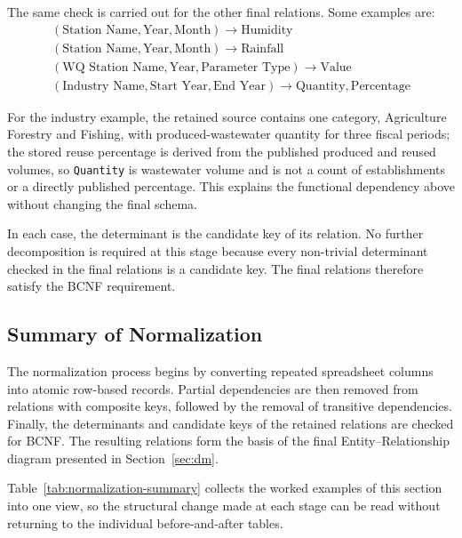 The same check is carried out for the other final relations. Some examples are:
\begin{gather*}
(\text{Station Name},\text{Year},\text{Month})\rightarrow \text{Humidity}\\
(\text{Station Name},\text{Year},\text{Month})\rightarrow \text{Rainfall}\\
(\text{WQ Station Name},\text{Year},\text{Parameter Type})
\rightarrow \text{Value}\\
(\text{Industry Name},\text{Start Year},\text{End Year})
\rightarrow \text{Quantity},\text{Percentage}
\end{gather*}

For the industry example, the retained source contains one category,
Agriculture Forestry and Fishing, with produced-wastewater quantity for three
fiscal periods; the stored reuse percentage is derived from the published
produced and reused volumes, so \texttt{Quantity} is wastewater volume and is
not a count of establishments or a directly published percentage. This
explains the functional dependency above without changing the final schema.

In each case, the determinant is the candidate key of its relation. No further
decomposition is required at this stage because every non-trivial determinant
checked in the final relations is a candidate key. The final relations
therefore satisfy the BCNF requirement.

\subsection{Summary of Normalization}
\label{subsec:normalization-summary}

The normalization process begins by converting repeated spreadsheet columns
into atomic row-based records. Partial dependencies are then removed from
relations with composite keys, followed by the removal of transitive
dependencies. Finally, the determinants and candidate keys of the retained
relations are checked for BCNF. The resulting relations form the basis of the
final Entity--Relationship diagram presented in Section~\ref{sec:dm}.

Table~\ref{tab:normalization-summary} collects the worked examples of this
section into one view, so the structural change made at each stage can be read
without returning to the individual before-and-after tables.

